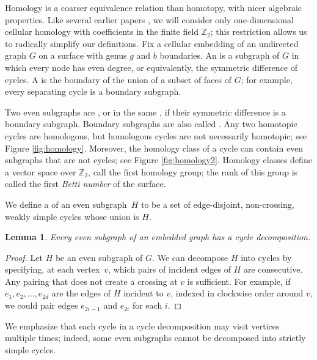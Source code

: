 \documentclass[11pt,twoside]{article}
\def\Z{\mathbb{Z}}
\newtheorem{lemma}[theorem]{Lemma}
\begin{document}
Homology is a coarser equivalence relation than homotopy, with nicer
algebraic properties.  Like several earlier papers \cite{cf-qhc2-07,
cf-qhc-08, dls-chtl-07, dlsc-cgaht-08,e-sncds-11,f-sntcd-13}, we will consider only
one-dimensional cellular homology with coefficients in the finite
field $\Z_2$; this restriction allows us to radically simplify our
definitions.
Fix a cellular embedding of an undirected graph $G$ on a surface with genus $g$ and $b$ boundaries.  An  is a subgraph of $G$ in which every node has even degree, or equivalently, the symmetric difference of cycles.  A  is the boundary of the union of a subset of faces of $G$; for example, every separating cycle is a boundary subgraph.

Two even subgraphs are , or in the same , if their symmetric difference is a boundary subgraph.
Boundary subgraphs are also called .  Any two homotopic cycles are homologous, but homologous cycles are not necessarily homotopic; see Figure \ref{fig:homology}.  Moreover, the homology class of a cycle can contain even subgraphs that are not cycles; see Figure \ref{fig:homology2}.
Homology classes define a vector space over $\Z_2$, call the first homology group;  the rank of this group is  called the first \emph{Betti number} of the surface.


We define a  of an even subgraph~$H$ to be a set of edge-disjoint, non-crossing, weakly simple cycles whose union is $H$.

\begin{lemma}
\label{lem:decomposition}
Every even subgraph of an embedded graph has a cycle decomposition.
\end{lemma}

\begin{proof}
Let $H$ be an even subgraph of $G$.  We can decompose $H$ into cycles by specifying, at each vertex~$v$, which pairs of incident edges of $H$ are consecutive.  Any pairing that does not create a crossing at $v$ is sufficient.  For example, if $e_1, e_2, \dots, e_{2d}$ are the edges of $H$ incident to $v$, indexed in clockwise order around $v$, we could pair edges $e_{2i-1}$ and $e_{2i}$ for each $i$.
\end{proof}

We emphasize that each cycle in a cycle decomposition may visit vertices multiple times; indeed, some even subgraphs cannot be decomposed into strictly simple cycles.
\end{document}
